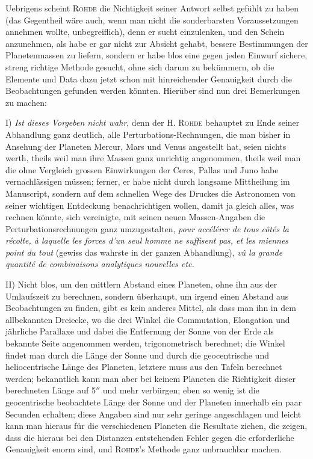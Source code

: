 Uebrigens scheint \textsc{Rohde} die Nichtigkeit seiner Antwort selbst gefühlt zu haben (das Gegentheil wäre auch, wenn man nicht die sonderbarsten Voraussetzungen annehmen wollte, unbegreiflich), denn er sucht einzulenken, und den Schein anzunehmen, als habe er gar nicht zur Absicht gehabt, bessere Bestimmungen der Planetenmassen zu liefern, sondern er habe blos eine gegen jeden Einwurf sichere, streng richtige Methode gesucht, ohne sich darum zu bekümmern, ob die Elemente und Data dazu jetzt schon mit hinreichender Genauigkeit durch die Beobachtungen gefunden werden könnten. Hierüber sind nun drei Bemerkungen zu machen:

\noindent I) \emph{Ist dieses Vorgeben nicht wahr}, denn der H. \textsc{Rohde} behauptet zu Ende seiner Abhandlung ganz deutlich, alle Perturbations-Rechnungen, die man bisher in Ansehung der Planeten Mercur, Mars und Venus angestellt hat, seien nichts werth, theils weil man ihre Massen ganz unrichtig angenommen, theils weil man die ohne Vergleich grossen Einwirkungen der Ceres, Pallas und Juno habe vernachlässigen müssen; ferner, er habe nicht durch langsame Mittheilung im Manuscript, sondern auf dem schnellen Wege des Druckes die Astronomen von seiner wichtigen Entdeckung benachrichtigen wollen, damit ja gleich alles, was rechnen könnte, sich vereinigte, mit seinen neuen Massen-Angaben die Perturbationsrechnungen ganz umzugestalten, \emph{pour accélérer de tous côtés la récolte, à laquelle les forces d'un seul homme ne suffisent pas, et les miennes point du tout} (gewiss das wahrste in der ganzen Abhandlung), \emph{vû la grande quantité de combinaisons analytiques nouvelles etc.}

\noindent II) Nicht blos, um den mittlern Abstand eines Planeten, ohne ihn aus der Umlaufszeit zu berechnen, sondern überhaupt, um irgend einen Abstand aus Beobachtungen zu finden, gibt es kein anderes Mittel, als dass man ihn in dem allbekannten Dreiecke, wo die drei Winkel die Commutation, Elongation und jährliche Parallaxe und dabei die Entfernung der Sonne von der Erde als bekannte Seite angenommen werden, trigonometrisch berechnet; die Winkel findet man durch die Länge der Sonne und durch die geocentrische und heliocentrische Länge des Planeten, letztere muss aus den Tafeln berechnet werden; bekanntlich kann man aber bei keinem Planeten die Richtigkeit dieser berechneten Länge auf 5$''$ und mehr verbürgen; eben so wenig ist die geocentrische beobachtete Länge der Sonne und der Planeten innerhalb ein paar Secunden erhalten; diese Angaben sind nur sehr geringe angeschlagen und leicht kann man hieraus für die verschiedenen Planeten die Resultate ziehen, die zeigen, dass die hieraus bei den Distanzen entstehenden Fehler gegen die erforderliche Genauigkeit enorm sind, und \textsc{Rohde}'s Methode ganz unbrauchbar machen.

